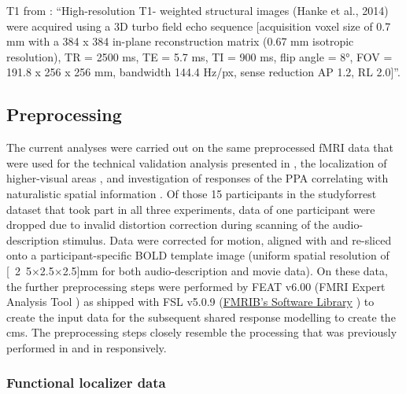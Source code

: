 %
T1 from \citep{ben2018hippocampal}: ``High-resolution T1- weighted structural
images (Hanke et al., 2014) were acquired using a 3D turbo field echo sequence
[acquisition voxel size of 0.7 mm with a 384 x 384 in-plane reconstruction
matrix (0.67 mm isotropic resolution), TR = 2500 ms, TE = 5.7 ms, TI = 900 ms,
flip angle = 8°, FOV = 191.8 x 256 x 256 mm, bandwidth 144.4 Hz/px, sense
reduction AP 1.2, RL 2.0]''.


\subsection{Preprocessing}


The current analyses were carried out on the same preprocessed fMRI data
\citep{hanke2016aligned} that were used for the technical validation analysis
presented in \citet{hanke2016simultaneous}, the localization of higher-visual
areas \citep{sengupta2016extension}, and investigation of responses of the PPA
correlating with naturalistic spatial information \citep{sengupta2016extension}.
Of those 15 participants in the studyforrest dataset that took part in all three
experiments, data of one participant were dropped due to invalid distortion
correction during scanning of the audio-description stimulus.
Data were corrected for motion, aligned with and re-sliced onto a
participant-specific BOLD template image \citep{sengupta2016extension} (uniform
spatial resolution of \unit[2.5$\times$2.5$\times$2.5]{mm} for both
audio-description and movie data).
On these data, the further preprocessing steps were performed by FEAT v6.00
(FMRI Expert Analysis Tool \citep{woolrich2001autocorr}) as shipped with FSL
v5.0.9 (\href{https://www.fmrib.ox.ac.uk/fsl}{FMRIB's Software Library}
\citep{smith2004fsl}) to create the input data for the subsequent shared
response modelling to create the \ac{cms}.
%
The preprocessing steps closely resemble the processing that was previously
performed in \citet{sengupta2016extension} and in \citet{haeusler2022processing}
responsively.

%

\subsubsection{Functional localizer data}

